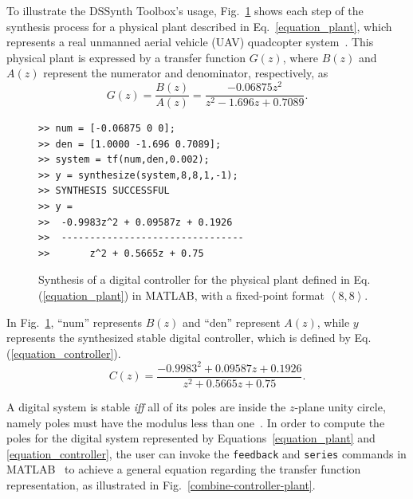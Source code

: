 \documentclass[10pt,conference]{IEEEtran}
\newcommand\tool{{DSSynth Toolbox}\xspace}
\begin{document}
To illustrate the \tool's usage, Fig.~\ref{toolbox-usage} shows each step of the 
synthesis process for a physical plant described in Eq.~\eqref{equation_plant},
which represents a real unmanned aerial vehicle (UAV) quadcopter system~\cite{bouabdallah}. 
This physical plant is expressed by a transfer function $G(z)$, where 
$B(z)$ and $A(z)$ represent the numerator and denominator, respectively, as
%
\begin{equation}
\label{equation_plant}
G(z)=\frac{B(z)}{A(z)}=\frac{-0.06875z^{2}}{z^2-1.696z+0.7089}.
\end{equation}

\begin{figure}[ht]
\scriptsize
\begin{lstlisting}[xleftmargin=.025\textwidth,xrightmargin=.025\textwidth, frame=single,]
>> num = [-0.06875 0 0];
>> den = [1.0000 -1.696 0.7089];
>> system = tf(num,den,0.002);
>> y = synthesize(system,8,8,1,-1);
>> SYNTHESIS SUCCESSFUL
>> y = 
>>  -0.9983z^2 + 0.09587z + 0.1926
>>  --------------------------------
>>       z^2 + 0.5665z + 0.75
\end{lstlisting}
\vspace{-0.2cm}
\caption{Synthesis of a digital controller for the physical plant defined in Eq.(\ref{equation_plant}) in MATLAB, with a fixed-point format  $\left\langle 8,8\right\rangle$.}
\label{toolbox-usage}
\end{figure}

In Fig.~\ref{toolbox-usage}, ``num'' represents $B(z)$ and ``den'' represent $A(z)$, while 
$y$ represents the synthesized stable digital controller, which is defined by Eq.(\ref{equation_controller}).
%
\begin{equation}
\label{equation_controller}
C(z)=\frac{-0.9983^{2}+0.09587z+0.1926}{z^2+0.5665z+0.75}.
\end{equation}

A digital system is stable \textit{iff} all of its poles are inside the
$z$-plane unity circle, namely poles must have the modulus less than
one~\cite{astrom1997computer}.  In order to compute the poles for the
digital system represented by Equations~\eqref{equation_plant} and
\eqref{equation_controller}, the user can invoke the \texttt{feedback} and
\texttt{series} commands in MATLAB~\cite{matlab-toolbox} to achieve a
general equation regarding the transfer function representation, as
illustrated in Fig.~\ref{combine-controller-plant}.
\end{document}
